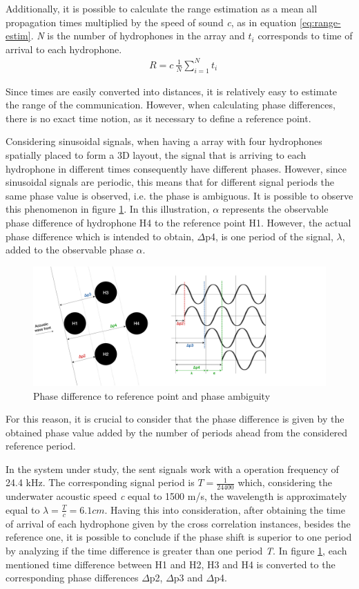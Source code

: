Additionally, it is possible to calculate the range estimation as a mean all propagation times multiplied by the speed of sound \textit{c}, as in equation \ref{eq:range-estim}. \textit{N} is the number of hydrophones in the array and \textit{$t_{i}$} corresponds to time of arrival to each hydrophone.
\begin{eqnarray}
& R = c\ \frac{1}{N} \displaystyle\sum_{i=1}^{N} t_{i}
\label{eq:range-estim}
\end{eqnarray}

Since times are easily converted into distances, it is relatively easy to estimate the range of the communication. However, when calculating phase differences, there is no exact time notion, as it necessary to define a reference point. 

Considering sinusoidal signals, when having a array with four hydrophones spatially placed to form a 3D layout, the signal that is arriving to each  hydrophone in different times consequently have different phases. However, since sinusoidal signals are periodic, this means that for different signal periods the same phase value is observed, i.e. the phase is ambiguous. It is possible to observe this phenomenon in figure \ref{fig:phasediff}. In this illustration, $\alpha$ represents the observable phase difference of hydrophone H4 to the reference point H1. However, the actual phase difference which is intended to obtain, $\Delta$p4, is one period of the signal, $\lambda$, added to the observable phase $\alpha$.
\begin{figure}[!htbp]
	\centering
	\includegraphics[width=1.2\textwidth]{figures/phase-diff}
	\caption{Phase difference to reference point and phase ambiguity}
	\label{fig:phasediff}
\end{figure}
For this reason, it is crucial to consider that the phase difference is given by the obtained phase value added by the number of periods ahead from the considered reference period.

In the system under study, the sent signals work with a operation frequency of 24.4 kHz. The corresponding signal period is $T = \frac{1}{24400} $ which, considering the underwater acoustic speed \textit{c} equal to 1500 m/s, the wavelength is approximately equal to $\lambda = \frac{T}{c} = 6.1 cm$. Having this into consideration, after obtaining the time of arrival of each hydrophone given by the cross correlation instances, besides the reference one, it is possible to conclude if the phase shift is superior to one period by analyzing if the time difference is greater than one period \textit{T}. In figure \ref{fig:phasediff}, each mentioned time difference between H1 and H2, H3 and H4 is converted to the corresponding phase differences $\Delta$p2, $\Delta$p3 and $\Delta$p4.

